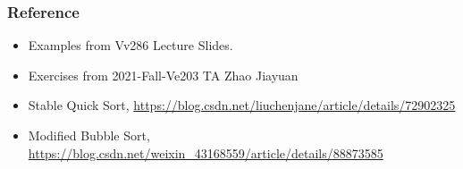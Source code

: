 \documentclass{beamer}
\begin{document}
\begin{frame}
    \frametitle{Reference}

    \begin{itemize}
        \item Examples from Vv286 Lecture Slides.
        \item Exercises from 2021-Fall-Ve203 TA Zhao Jiayuan
        \item Stable Quick Sort, \url{https://blog.csdn.net/liuchenjane/article/details/72902325}
        \item Modified Bubble Sort, \url{https://blog.csdn.net/weixin_43168559/article/details/88873585}
    \end{itemize}

\end{frame}
\end{document}
